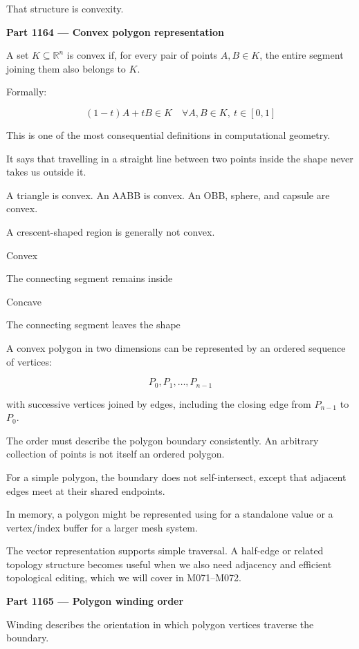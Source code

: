 That structure is convexity.

\textbf{Part 1164 --- Convex polygon representation}

A set \(K\subseteq\mathbb R^n\) is convex if, for every pair of points \(A,B\in K\), the entire segment joining them also belongs to \(K\).

Formally:

\[
\boxed{ (1-t)A+tB\in K \quad \forall A,B\in K,\ t\in[0,1] }
\]

This is one of the most consequential definitions in computational geometry.

It says that travelling in a straight line between two points inside the shape never takes us outside it.

A triangle is convex. An AABB is convex. An OBB, sphere, and capsule are convex.

A crescent-shaped region is generally not convex.

Convex

The connecting segment remains inside

Concave

The connecting segment leaves the shape

A convex polygon in two dimensions can be represented by an ordered sequence of vertices:

\[
P_0,P_1,\ldots,P_{n-1}
\]

with successive vertices joined by edges, including the closing edge from \(P_{n-1}\) to \(P_0\).

The order must describe the polygon boundary consistently. An arbitrary collection of points is not itself an ordered polygon.

For a simple polygon, the boundary does not self-intersect, except that adjacent edges meet at their shared endpoints.

In memory, a polygon might be represented using  for a standalone value or a vertex/index buffer for a larger mesh system.

The vector representation supports simple traversal. A half-edge or related topology structure becomes useful when we also need adjacency and efficient topological editing, which we will cover in M071--M072.

\textbf{Part 1165 --- Polygon winding order}

Winding describes the orientation in which polygon vertices traverse the boundary.

